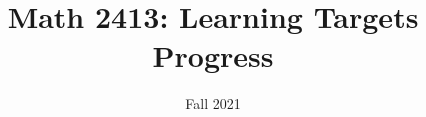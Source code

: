 \documentclass{article}
\title{Math 2413: Learning Targets Progress}
\date{Fall 2021}
\begin{document}
\newcommand{\bxi}{\tikz \draw[thick] (0,0) rectangle ++(0.5,0.5) ++ (-0.20,-0.25) node {\cmark};}
\newcommand{\bxI}{\tikz \draw[thick] (0,0) rectangle ++(0.5,0.5);}
\newcommand{\cxi}{\tikz \draw[thick] (0cm,0cm) circle(0.25cm) ++ (0.03,0) node {\cmark};}
\newcommand{\cxI}{\tikz \draw[thick] (0cm,0cm) circle(0.25cm);}



\end{document}
